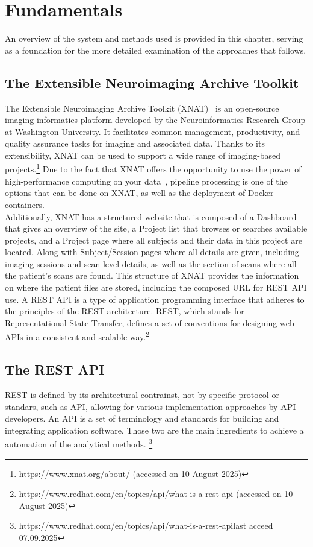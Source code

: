 
\chapter{Fundamentals}

An overview of the system and methods used is provided in this chapter, serving as a foundation for the more detailed examination of the approaches that follows. 

\section{The Extensible Neuroimaging Archive Toolkit}
The Extensible Neuroimaging Archive Toolkit (XNAT)~\cite{marcus_extensible_2007} is an open-source imaging informatics platform developed by the Neuroinformatics Research Group at Washington University. It facilitates common management, productivity, and quality assurance tasks for imaging and associated data. Thanks to its extensibility, XNAT can be used to support a wide range of imaging-based projects.\footnote{\url{https://www.xnat.org/about/} (accessed on 10 August 2025)} Due to the fact that XNAT offers the opportunity to use the power of high-performance computing on your data~\cite{zaschke_extending_2024}, 
pipeline processing is one of the options that can be done on XNAT, as well as the deployment of Docker containers.
\\
Additionally, XNAT has a structured website that is composed of a Dashboard that gives an overview of the site, a Project list that browses or searches available projects, and a Project page where all subjects and their data in this project are located. Along with Subject/Session pages where all details are given, including imaging sessions and scan-level details, as well as the section of scans where all the patient’s scans are found. 
This structure of XNAT provides the information on where the patient files are stored, including the composed URL for REST API use. A REST API is a type of application programming interface that adheres to the principles of the REST architecture. REST, which stands for Representational State Transfer, defines a set of conventions for designing web APIs in a consistent and scalable way.\footnote{\url{https://www.redhat.com/en/topics/api/what-is-a-rest-api} (accessed on 10 August 2025)}
\\

\section{The REST API}
REST is defined by its architectural contrainst, not by specific protocol or standars, such as API, allowing for various implementation approaches by API developers.
An API is a set of terminology and standards for building and integrating application software. Those two are the main ingredients to achieve a automation of the analytical methods. \footnote{https://www.redhat.com/en/topics/api/what-is-a-rest-api{last acceed 07.09.2025}}

